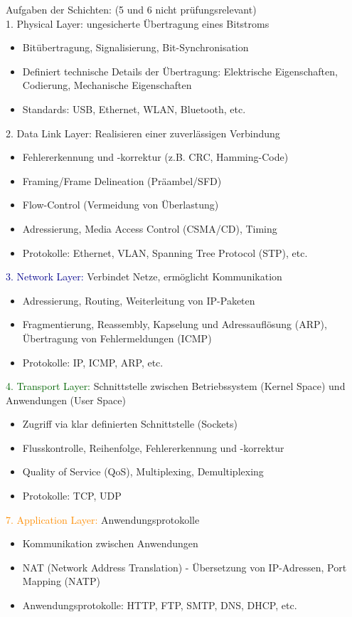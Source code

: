 \begin{KR}{Aufgaben der Schichten:} (5 und 6 nicht prüfungsrelevant)\\
    \textcolor{darkcorn}{1. Physical Layer:} ungesicherte Übertragung eines Bitstroms
    \begin{itemize}
        \item Bitübertragung, Signalisierung, Bit-Synchronisation
        \item Definiert technische Details der Übertragung: 
        Elektrische Eigenschaften, 
        Codierung, 
        Mechanische Eigenschaften
        \item Standards: USB, Ethernet, WLAN, Bluetooth, etc.
    \end{itemize}
    \textcolor{darkpurple}{2. Data Link Layer:} Realisieren einer zuverlässigen Verbindung
    \begin{itemize}
        \item Fehlererkennung und -korrektur (z.B. CRC, Hamming-Code)
        \item Framing/Frame Delineation (Präambel/SFD) 
        \item Flow-Control (Vermeidung von Überlastung) 
        \item Adressierung, Media Access Control (CSMA/CD), Timing
        \item Protokolle: Ethernet, VLAN, Spanning Tree Protocol (STP), etc.
    \end{itemize}
    \textcolor{darkblue}{3. Network Layer:} Verbindet Netze, ermöglicht Kommunikation
    \begin{itemize}
        \item Adressierung, Routing, Weiterleitung von IP-Paketen
        \item Fragmentierung, Reassembly, Kapselung und Adressauflösung (ARP), Übertragung von Fehlermeldungen (ICMP)
        \item Protokolle: IP, ICMP, ARP, etc.
    \end{itemize}
    \textcolor{darkgreen}{4. Transport Layer:} Schnittstelle zwischen Betriebssystem (Kernel Space) und Anwendungen (User Space)
    \begin{itemize}
        \item Zugriff via klar definierten Schnittstelle (Sockets)
        \item Flusskontrolle, Reihenfolge, Fehlererkennung und -korrektur
        \item Quality of Service (QoS), Multiplexing, Demultiplexing
        \item Protokolle: TCP, UDP
    \end{itemize}
    \textcolor{darkorange}{7. Application Layer:} Anwendungsprotokolle 
    \begin{itemize}
        \item Kommunikation zwischen Anwendungen
        \item NAT (Network Address Translation) - Übersetzung von IP-Adressen, Port Mapping (NATP)
        \item Anwendungsprotokolle: HTTP, FTP, SMTP, DNS, DHCP, etc.
    \end{itemize}
\end{KR}




 
    
 